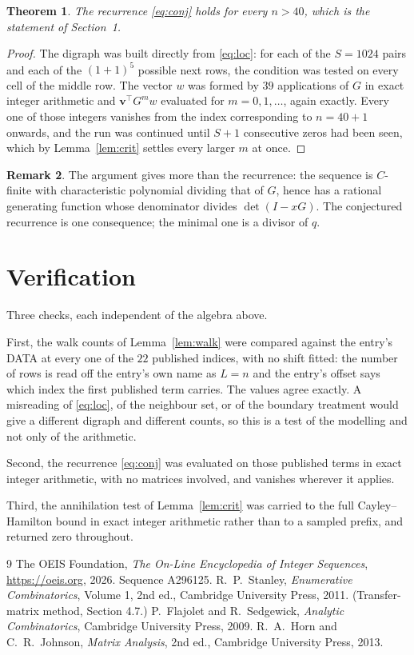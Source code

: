 \documentclass[11pt,a4paper]{article}
\theoremstyle{plain}
\newtheorem{theorem}{Theorem}
\theoremstyle{definition}
\newtheorem{remark}[theorem]{Remark}
\begin{document}
\begin{theorem}
The recurrence \eqref{eq:conj} holds for every $n>40$, which is the statement of
Section~1.
\end{theorem}

\begin{proof}
The digraph was built directly from \eqref{eq:loc}: for each of the $S=1024$ pairs and each
of the $(1+1)^{5}$ possible next rows, the condition was tested on every cell of
the middle row. The vector $w$ was formed by $39$ applications of $G$ in exact integer
arithmetic and $\mathbf{v}^{\!\top}G^{m}w$ evaluated for $m=0,1,\dots$, again exactly.
Every one of those integers vanishes from the index corresponding to $n=40+1$ onwards,
and the run was continued until $S+1$ consecutive zeros had been seen, which by
Lemma~\ref{lem:crit} settles every larger $m$ at once.
\end{proof}

\begin{remark}
The argument gives more than the recurrence: the sequence is $C$-finite with characteristic
polynomial dividing that of $G$, hence has a rational generating function whose denominator
divides $\det(I-xG)$. The conjectured recurrence is one consequence; the minimal one is a
divisor of $q$.
\end{remark}

\section{Verification}

Three checks, each independent of the algebra above.

First, the walk counts of Lemma~\ref{lem:walk} were compared against the entry's DATA at
every one of the $22$ published indices, with no shift fitted: the number of rows is
read off the entry's own name as $L=n$ and the entry's offset says which index the first
published term carries. The values agree exactly. A misreading of \eqref{eq:loc}, of the
neighbour set, or of the boundary treatment would give a different digraph and different
counts, so this is a test of the modelling and not only of the arithmetic.

Second, the recurrence \eqref{eq:conj} was evaluated on those published terms in exact
integer arithmetic, with no matrices involved, and vanishes wherever it applies.

Third, the annihilation test of Lemma~\ref{lem:crit} was carried to the full
Cayley--Hamilton bound in exact integer arithmetic rather than to a sampled prefix, and
returned zero throughout.

\begin{thebibliography}{9}
 The OEIS Foundation, \emph{The On-Line Encyclopedia of Integer
Sequences}, \url{https://oeis.org}, 2026. Sequence A296125.
 R.~P.~Stanley, \emph{Enumerative Combinatorics}, Volume 1, 2nd ed.,
Cambridge University Press, 2011. (Transfer-matrix method, Section 4.7.)
 P.~Flajolet and R.~Sedgewick, \emph{Analytic Combinatorics}, Cambridge
University Press, 2009.
 R.~A.~Horn and C.~R.~Johnson, \emph{Matrix Analysis}, 2nd ed., Cambridge
University Press, 2013.
\end{thebibliography}
\end{document}

